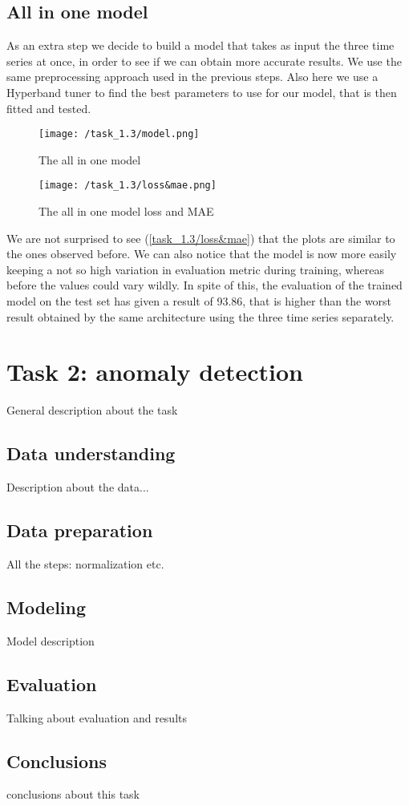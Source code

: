 \documentclass[12pt,a4paper,leqno]{article}
\begin{document}
	\subsection{All in one model}
	As an extra step we decide to build a model that takes as input the three time series at once, in order to see if we can obtain more accurate results. We use the same preprocessing approach used in the previous steps. Also here we use a Hyperband tuner to find the best parameters to use for our model, that is then fitted and tested.
	\begin{figure}
		\centering
		\texttt{[image: /task\_1.3/model.png]}
		\caption{The all in one model}
		\label{task_1.3/model}
	\end{figure}
	\begin{figure}
		\centering
		\texttt{[image: /task\_1.3/loss\&mae.png]}
		\caption{The all in one model loss and MAE}
		\label{task_1.3/loss&mae}
	\end{figure}

	We are not surprised to see (\autoref{task_1.3/loss&mae}) that the plots are similar to the ones observed before. We can also notice that the model is now more easily keeping a not so high variation in evaluation metric during training, whereas before the values could vary wildly. In spite of this, the evaluation of the trained model on the test set has given a result of 93.86, that is higher than the worst result obtained by the same architecture using the three time series separately.
	
	\newpage
	
	\section{Task 2: anomaly detection}
	General description about the task
	\subsection{Data understanding}
	Description about the data...
	\subsection{Data preparation}
	All the steps: normalization etc.
	\subsection{Modeling}
	Model description
	\subsection{Evaluation}
	Talking about evaluation and results
	\subsection{Conclusions}
	conclusions about this task
\end{document}
